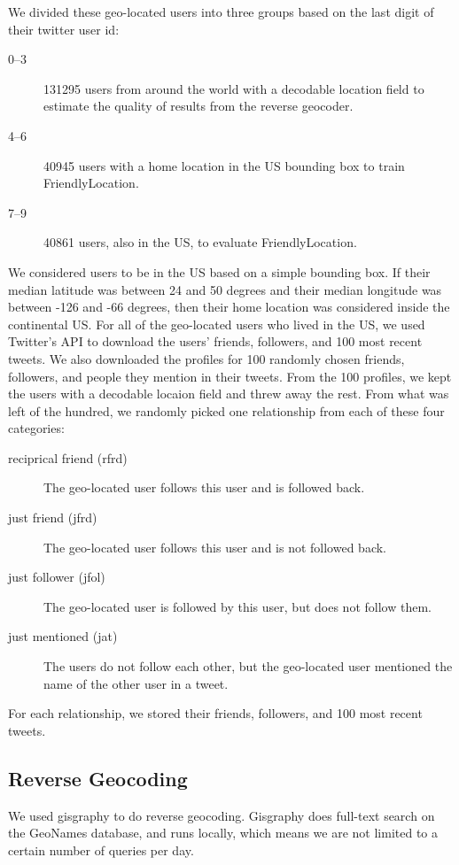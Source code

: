 \documentclass{sig-alternate}
\begin{document}
We divided these geo-located users into three groups based on the last digit of their twitter user id:
\begin{description}
\item[0--3] 131295 users from around the world with a decodable location field to estimate the quality of results from the reverse geocoder.
\item[4--6] 40945 users with a home location in the US bounding box to train FriendlyLocation.
\item[7--9] 40861 users, also in the US, to evaluate FriendlyLocation.
\end{description}


We considered users to be in the US based on a simple bounding box.  If their median latitude was between 24 and 50 degrees and their median longitude was between -126 and -66 degrees, then their home location was considered inside the continental US.
For all of the geo-located users who lived in the US, we used Twitter's API to download the users' friends, followers, and 100 most recent tweets. We also downloaded the profiles for 100 randomly chosen friends, followers, and people they mention in their tweets.
From the 100 profiles, we kept the users with a decodable locaion field and threw away the rest. From what was left of the hundred, we randomly picked one relationship from each of these four categories:
\begin{description}
\item[reciprical friend (rfrd)] The geo-located user follows this user and is followed back.
\item[just friend (jfrd)] The geo-located user follows this user and is not followed back.
\item[just follower (jfol)]The geo-located user is followed by this user, but does not follow them.
\item[just mentioned (jat)] The users do not follow each other, but the geo-located user mentioned the name of the other user in a tweet.
\end{description}
For each relationship, we stored their friends, followers, and 100 most recent tweets.

\subsection{Reverse Geocoding}
We used gisgraphy to do reverse geocoding. Gisgraphy does full-text search on the GeoNames database, and runs locally, which means we are not limited to a certain number of queries per day.
\end{document}
